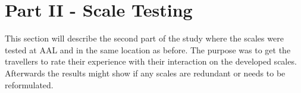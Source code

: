 \section{Part II{\color{red} - Scale Testing}}
\label{MethodScaleTesting}
This section will describe the second part of the study where the scales were tested at AAL and in the same location as before. The purpose was to get the travellers to rate their experience with their interaction on the developed scales. Afterwards the results might show if any scales are redundant or needs to be reformulated.
%




